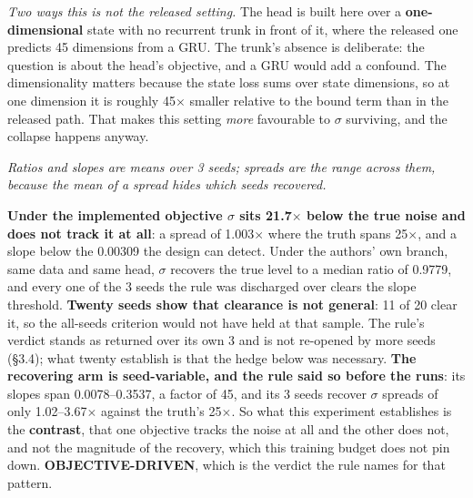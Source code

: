 \documentclass[10pt]{article}
\begin{document}
\emph{Two ways this is not the released setting.} The head is built here over a \textbf{one-dimensional} state with no recurrent trunk in front of it, where the released one predicts 45 dimensions from a GRU. The trunk's absence is deliberate: the question is about the head's objective, and a GRU would add a confound. The dimensionality matters because the state loss sums over state dimensions, so at one dimension it is roughly 45$\times$ smaller relative to the bound term than in the released path. That makes this setting \emph{more} favourable to $\sigma$ surviving, and the collapse happens anyway.

\begin{center}\small{}\end{center}

\emph{Ratios and slopes are means over 3 seeds; spreads are the range across them, because the mean of a spread hides which seeds recovered.}

\textbf{Under the implemented objective $\sigma$ sits 21.7$\times$ below the true noise and does not track it at all}: a spread of 1.003$\times$ where the truth spans 25$\times$, and a slope below the 0.00309 the design can detect. Under the authors' own branch, same data and same head, $\sigma$ recovers the true level to a median ratio of 0.9779, and every one of the 3 seeds the rule was discharged over clears the slope threshold. \textbf{Twenty seeds show that clearance is not general}: 11 of 20 clear it, so the all-seeds criterion would not have held at that sample. The rule's verdict stands as returned over its own 3 and is not re-opened by more seeds (\S{}3.4); what twenty establish is that the hedge below was necessary. \textbf{The recovering arm is seed-variable, and the rule said so before the runs}: its slopes span 0.0078--0.3537, a factor of 45, and its 3 seeds recover $\sigma$ spreads of only 1.02--3.67$\times$ against the truth's 25$\times$. So what this experiment establishes is the \textbf{contrast}, that one objective tracks the noise at all and the other does not, and not the magnitude of the recovery, which this training budget does not pin down. \textbf{OBJECTIVE-DRIVEN}, which is the verdict the rule names for that pattern.
\end{document}
